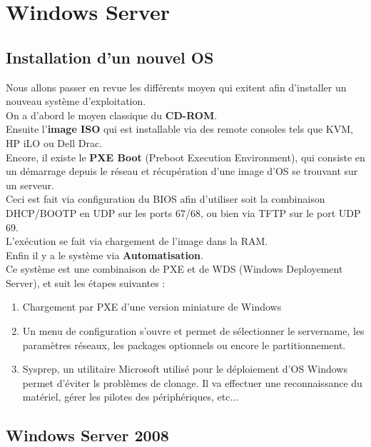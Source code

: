 \documentclass{report}
\begin{document}
\chapter{Windows Server}

	\section{Installation d'un nouvel OS}

		Nous allons passer en revue les différents moyen qui exitent afin d'installer un nouveau système d'exploitation.\\

		On a d'abord le moyen classique du \textbf{CD-ROM}.\\
		Ensuite l'\textbf{image ISO} qui est installable via des remote consoles tels que KVM, HP iLO ou Dell Drac.\\

		Encore, il existe le \textbf{PXE Boot} (Preboot Execution Environment), qui consiste en un démarrage depuis le réseau et récupération d'une image d'OS se trouvant sur un serveur.\\
		Ceci est fait via configuration du BIOS afin d'utiliser soit la combinaison DHCP/BOOTP en UDP sur les ports 67/68, ou bien via TFTP sur le port UDP 69.\\
		L'exécution se fait via chargement de l'image dans la RAM.\\

		Enfin il y a le système via \textbf{Automatisation}.\\
		Ce système est une combinaison de PXE et de WDS (Windows Deployement Server), et suit les étapes suivantes : \\
		\begin{enumerate}
			\item Chargement par PXE d'une version miniature de Windows
			\item Un menu de configuration s'ouvre et permet de sélectionner le servername, les paramètres réseaux, les packages optionnels ou encore le partitionnement.
			\item Sysprep, un utilitaire Microsoft utilisé pour le déploiement d'OS Windows permet d'éviter ls problèmes de clonage. Il va effectuer une reconnaissance du matériel, gérer les pilotes des périphériques, etc...\\
		\end{enumerate}

	\section{Windows Server 2008}
\end{document}
